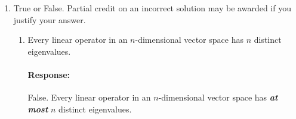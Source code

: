 \documentclass [11pt] {article}
\newcommand{\R}{\mathbb{R}}
\newcommand{\T}{\bf{T}}
\newcommand{\A}{\bf{A}}
\newcommand{\U}{\bf{U}}
\newcommand{\V}{\bf{V}}
\newcommand{\AT}{\bf{A$^{\T}$}}
\newenvironment{response}{\vspace{-10pt}\paragraph{Response:}}{}
\renewcommand{\it}[1]{\textit{{#1}}}
\renewcommand{\bf}[1]{\textbf{{#1}}}
\newcommand{\ib}[1]{\it{\bf{{#1}}}}
\begin{document}
\begin{enumerate}
\begin{enumerate}
\begin{enumerate}[itemsep=10pt]
\begin{response}
                            Similarly, we can write $\AT \A \in \R^{n \times n}$ as
                            \begin{align*}
                                \AT \A &= \left( \U \Sigma \V^{\T} \right)^{\T} \left( \U \Sigma \V^{\T} \right) \\
                                       &= \left( \V^{\T} \right)^{\T} \Sigma^{\T} \U^{\T} \U \Sigma \V^{\T} \\
                                       &= \V \Sigma^{\T} \U^{\T} \U \Sigma \V ^{\T} \\
                                       &= \V \Sigma^{\T} \bf{I} \Sigma \V ^{\T} && \U \text{ is orthogonal} \\
                                       &= \V \Sigma^2 \V ^{\T} && \Sigma \text{ is diagonal} \\
                            \end{align*}
                            Since $\V$ is orthogonal, we have $\V^{\T} = \V^{-1}$. So,
                            $\AT \A = \V \Sigma^2 \V^{\T}$, where $\V$ are the eigenvectors of 
                            \AT \A. Then, the right singular vectors of $\A$ are the eigenvectors of 
                            \AT \A.
                        \end{response}
                    \item What is the relationship between the singular values of $\A$ and the
                        eigenvalues of $\A \AT$? What about $\AT \A$?
                        \begin{response}
                            From the above part, we have that $\A \AT = \U \Sigma^2 \U^{\T}$ and
                            $\AT \A = \V \Sigma^2 \V^{\T}$. Then, the singular values of $\A$ are 
                            the square root of the eigenvalues of $\A \AT$ and $\AT \A$.
                        \end{response}
                \end{enumerate}
            \item True or False. Partial credit on an incorrect solution may be awarded if you
                justify your answer.
                \begin{enumerate}[itemsep=10pt]
                    \item Every linear operator in an $n$-dimensional vector space has $n$ distinct 
                        eigenvalues.
                        \begin{response}
                            False. Every linear operator in an $n$-dimensional vector space has 
                            \ib{at most} $n$ distinct eigenvalues.
                        \end{response}


\end{enumerate}
\end{enumerate}
\end{enumerate}
\end{document}
